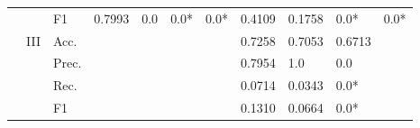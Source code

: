 \begin{tabular}{cclllllllll}
                                                                                                               &                                   & F1                                                   & 0.7993                  & 0.0                     & 0.0*                         & 0.0*                    & 0.4109                                                                       & 0.1758                                                                      & 0.0*                                      & 0.0*                                      \\ 
    \cmidrule{2-11}
                                                                                                               & \multirow{4}{*}{III}              & Acc.                                                 &                         &                         &                              &                         & 0.7258                                                                       & 0.7053                                                                      & 0.6713                                    &                                           \\
                                                                                                               &                                   & Prec.                                                &                         &                         &                              &                         & 0.7954                                                                       & 1.0                                                                         & 0.0                                       &                                           \\
                                                                                                               &                                   & Rec.                                                 &                         &                         &                              &                         & 0.0714                                                                       & 0.0343                                                                      & 0.0*                                      &                                           \\
                                                                                                               &                                   & F1                                                   &                         &                         &                              &                         & 0.1310                                                                       & 0.0664                                                                      & 0.0*                                      &                                           \\
    \bottomrule
    \end{tabular}